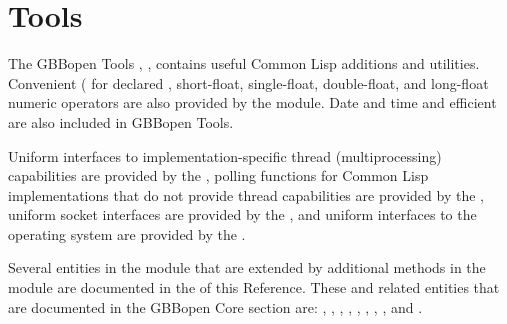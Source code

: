 \documentclass[10pt,twoside,english,pdftex]{article}
\begin{document}
\section{Tools}

%
%
%
The GBBopen Tools , , contains useful
Common Lisp additions and utilities.  Convenient ( for declared , short-float,
single-float, double-float, and long-float numeric operators are also provided
by the  module.  Date and time  and efficient
 are also included in
GBBopen Tools.

Uniform interfaces to implementation-specific thread (multiprocessing)
capabilities are provided by the , polling functions for Common Lisp
implementations that do not provide thread capabilities are
provided by the , uniform socket interfaces are
provided by the , and uniform interfaces to the operating
system are provided by the .

Several entities in the  module that are extended by
additional methods in the  module are documented in the
 of this Reference.  These and related entities that are
documented in the GBBopen Core section are:
\textbf{},
\textbf{},
\textbf{}, 
\textbf{},
\textbf{},
\textbf{},
\textbf{},
\textbf{},
and \textbf{}.

\W\entities
\T\clearpage
\T\renewcommand{\headrulewidth}{0.01pt}

\end{document}
